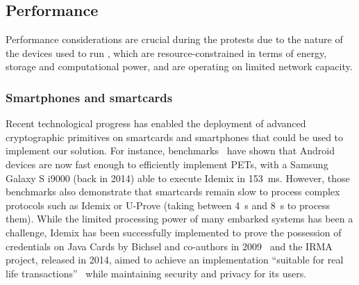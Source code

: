 \subsection{Performance}%
\label{PerformanceAnalysis}


Performance considerations are crucial during the protests due to the nature of 
the devices used to run \CROCUS, which are resource-constrained in terms of 
energy, storage and computational power, and are operating on limited network 
capacity. 

\subsubsection{Smartphones and smartcards}

Recent technological progress has enabled the deployment of advanced 
cryptographic primitives on smartcards and smartphones that could be used to 
implement our solution.
For instance, benchmarks~\cite{Benchmarking} have shown that Android devices 
are now fast enough to efficiently implement \acp{PET}, with a Samsung Galaxy S 
i9000 (back in 2014) able to execute Idemix in \SI{153}{\milli\second}. 
However, those benchmarks also demonstrate that smartcards remain slow to 
process complex protocols such as Idemix or U-Prove (taking between 
\SI{4}{\second} and \SI{8}{\second} to process them). While the limited 
processing power of many embarked systems has been a challenge, Idemix has been 
successfully implemented to prove the possession of credentials on Java Cards 
by Bichsel and co-authors in 2009~\cite{Bichsel} and the IRMA project, released 
in 2014, aimed to achieve an implementation ``suitable for real life 
transactions''~\cite{IRMA} while maintaining security and privacy for its 
users. 

